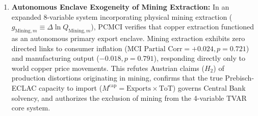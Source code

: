 \begin{enumerate}[leftmargin=2em]
	\item \textbf{Autonomous Enclave Exogeneity of Mining Extraction:} In an expanded 8-variable system incorporating physical mining extraction ($g_{\text{Mining},m} \equiv \Delta \ln Q_{\text{Mining},m}$), PCMCI verifies that copper extraction functioned as an autonomous primary export enclave. Mining extraction exhibits zero directed links to consumer inflation ($\text{MCI Partial Corr} = +0.024, p = 0.721$) and manufacturing output ($-0.018, p = 0.791$), responding directly only to world copper price movements. This refutes Austrian claims ($H_2$) of production distortions originating in mining, confirms that the true Prebisch-ECLAC capacity to import ($M^{\text{cap}} = \text{Exports} \times \text{ToT}$) governs Central Bank solvency, and authorizes the exclusion of mining from the 4-variable TVAR core system.
\end{enumerate}
